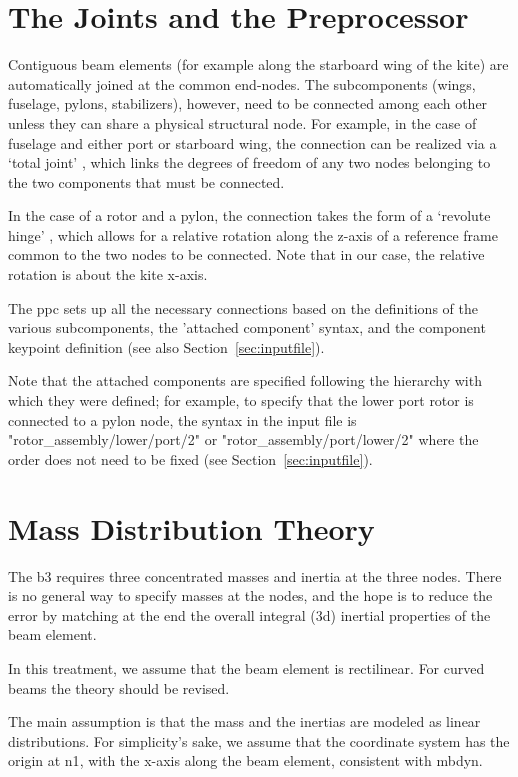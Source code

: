 \documentclass[report]{nrel}
\begin{document}
\section{The Joints and the Preprocessor}\label{sec:joints}
Contiguous beam elements (for example along the starboard wing of the kite) are automatically joined at the common end-nodes. The subcomponents (wings, fuselage, pylons, stabilizers), however, need to be connected among each other unless they can share a physical structural node. For example, in the case of fuselage and either port or starboard wing, the connection can be realized via a `total joint' \citep{masarati2017}, which links the degrees of freedom of any two nodes belonging to the two components that must be connected.

In the case of a rotor and a pylon, the connection takes the form of a `revolute hinge' \citep{masarati2017}, which allows for a relative rotation along the z-axis of a reference frame common to the two nodes to be connected. Note that in our case, the relative rotation is about the kite x-axis.
 
The \gls{ppc} sets up all the necessary connections based on the definitions of the various subcomponents,  the 'attached component' syntax, and the component keypoint definition (see also Section~\ref{sec:inputfile}). 

Note that the attached components are specified following the hierarchy with which they were defined; for example, to specify that the lower port rotor is connected to a pylon node, the syntax in the input file is "rotor\_assembly/lower/port/2" or "rotor\_assembly/port/lower/2" where the order does not need to be fixed (see Section~\ref{sec:inputfile}). 

\section{Mass Distribution Theory}\label{sec:massdist}
The \gls{b3} requires three concentrated masses and inertia at the three nodes. There is no general way to specify masses at the nodes, and the hope is to reduce the error by matching at the end the overall integral (\gls{3d}) inertial properties of the beam element. 

In this treatment, we assume that the beam element is rectilinear. For curved beams the theory should be revised.

The main assumption is that the mass and the inertias are modeled as linear distributions.
For simplicity's sake, we assume that the coordinate system has the origin at \gls{n1}, with the x-axis along the beam element, consistent with \gls{mbdyn}.
\end{document}
